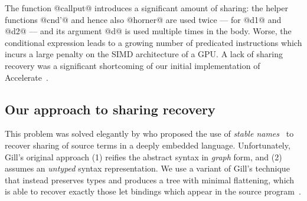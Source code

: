 The function @callput@ introduces a significant amount of sharing: the helper
functions @cnd'@ and hence also @horner@ are used twice --- for @d1@ and @d2@
--- and its argument @d@ is used multiple times in the body. Worse, the
conditional expression leads to a growing number of predicated instructions
which incurs a large penalty on the SIMD architecture of a GPU\@. A lack of
sharing recovery was a significant shortcoming of our initial implementation of
Accelerate~\cite{Chakravarty:2011fr}.

%


\subsection{Our approach to sharing recovery}

This problem was solved elegantly by \citet{Gill:2009dx} who proposed the use
of \emph{stable names}~\cite{PeytonJones:2000ks} to recover
sharing of source terms in a deeply embedded language. Unfortunately, Gill's
original approach (1) reifies the abstract syntax in \emph{graph} form, and (2)
assumes an \emph{untyped} syntax representation. We use a variant of Gill's
technique that instead preserves types and produces a tree with minimal
flattening, which is able to recover exactly those let bindings which appear in
the source program~\cite{McDonell:2013wi}.

